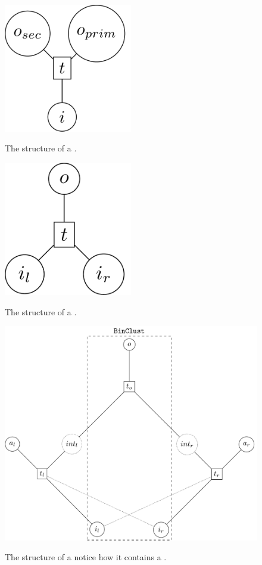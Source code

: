 \begin{figure}[H]
  \centering
  \includegraphics[width=0.5\textwidth]{./imgs/unclust.pdf}
  \label{fig:unclust}
  \caption{The structure of a .}
\end{figure}


\begin{figure}[H]
  \centering
  \includegraphics[width=0.5\textwidth]{./imgs/binclust.pdf}
  \label{fig:binclust}
  \caption{The structure of a .}
\end{figure}


\begin{figure}[H]
  \centering
  \includegraphics[width=.9\linewidth]{./imgs/joinclust.pdf}
  \label{fig:joinclust}
  \caption{The structure of a 
    notice how it contains a .}
\end{figure}

